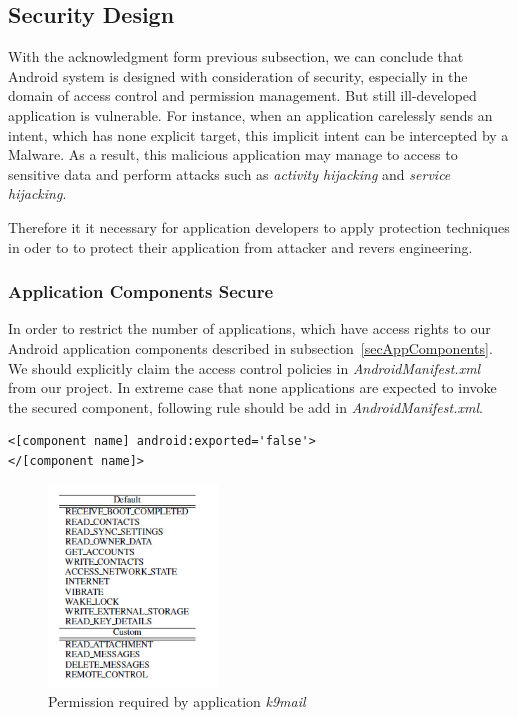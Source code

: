 \subsection{Security Design}
With the acknowledgment form previous subsection, we can conclude that Android system is designed with consideration of security, especially in the domain of access control and permission management. But still ill-developed application is vulnerable. For instance, when an application carelessly sends an intent, which has none explicit target, this implicit intent can be intercepted by a Malware. As a result, this malicious application may manage to access to sensitive data and perform attacks such as \emph{activity hijacking} and \emph{service hijacking}\cite{android_secure_inter}.

Therefore it it necessary for application developers to apply protection techniques  in oder to to protect their application from attacker and revers engineering. 
\subsubsection{Application Components Secure}
In order to restrict the number of applications, which have access rights to our Android application components described in subsection~\ref{secAppComponents}. We should explicitly claim the access control policies in \emph{AndroidManifest.xml} from our project. In extreme case that none applications are expected to invoke the secured component, following rule should be add in \emph{AndroidManifest.xml}\cite{android_secure_cook}.
\begin{Verbatim}[fontsize=\relsize{-1},frame=lines,framesep=4mm, label=\fbox{\small\emph{Component Securing}}]
<[component name] android:exported='false'>
</[component name]>
\end{Verbatim} 

\begin{figure}[!htb]
	\centering
	\includegraphics[width=0.4\textwidth]{android-permission2.jpg}
		\caption{Permission required by application \emph{k9mail}\cite{android_secure_design}}
	\label{fig:android-permission2}
\end{figure}
